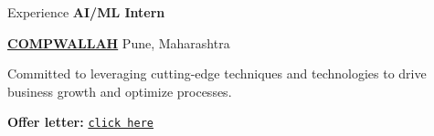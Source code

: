\begin{rubric}{Experience}
%
	\textbf{AI/ML Intern} \par
 \vspace{4pt}
        \href{https://compwallah.com/}{\textbf{COMPWALLAH}}
        Pune, Maharashtra\par
        Committed to leveraging cutting-edge techniques and technologies to drive business growth and optimize processes.\par
        \vspace{4pt}
\textbf{Offer letter:} \href{https://drive.google.com/file/d/1bjjxG9g22S3bLJI7DkKVEDRtH0chNrrc/view?usp=sharing}{\texttt{click here}}
\end{rubric}
